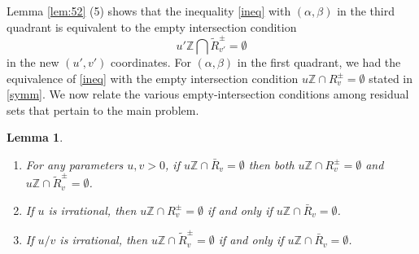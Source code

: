 \documentclass[12pt,letterpaper, reqno]{amsart}
\newtheorem{lem}[thm]{Lemma}
\theoremstyle{definition}
\theoremstyle{remark}
\newcommand{\ZZ}{\ensuremath{\mathbb{Z}}}
\newcommand{\uu}{{u'}}
\newcommand{\vv}{{v'}}
\newcommand{\R}{{R}}
\newcommand{\floor}[1]{\lfloor{#1}\rfloor}
\newcommand{\ceil}[1]{\lceil{#1}\rceil}
\begin{document}
Lemma \ref{lem:52} (5) shows that the inequality \eqref{ineq} with $(\alpha,\beta)$ in the third quadrant is equivalent to the empty intersection condition
\begin{equation}\label{intermediate}
{\uu} \ZZ \bigcap  \widetilde{\R}_\vv^{\pm}= \emptyset
\end{equation}
in the new $(\uu,\vv)$ coordinates.
For $(\alpha,\beta)$ in the first quadrant, we had the equivalence of \eqref{ineq} with the empty intersection condition $u\ZZ\cap R^\pm_v = \emptyset$ stated in \eqref{symm}.
We now relate the various empty-intersection conditions among residual sets that pertain to the main problem.
\begin{lem}\label{empty-intersections}
\begin{enumerate}
\item For any parameters $u,v>0$, if
$ u\ZZ\cap\bar{R}_v =\emptyset$ then both $ u\ZZ\cap R_v^\pm=\emptyset$
and 
$u\ZZ\cap  \widetilde{R}_{v}^\pm=\emptyset $.
\item If $u$ is irrational, then 
$ u\ZZ\cap R_v^\pm=\emptyset $ if and only if $ u\ZZ\cap\bar{R}_v = \emptyset$.
\item If $u/v$ is irrational, then
$ u\ZZ\cap \widetilde{R}_{v}^\pm =\emptyset $ if and only if $ u\ZZ\cap \bar{R}_v = \emptyset$.
\end{enumerate}
\end{lem}
\end{document}
